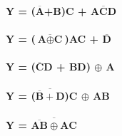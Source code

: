 \documentclass[a4paper, 100pt]{scrartcl}
\begin{document}
	
	\textbf{Y = ($\overline{\textbf{A}}$+B)C + $\overline{\textbf{ACD}}$} 
	\\
	\\
	\textbf{Y = ($\overline{\textbf{A} \oplus\textbf{C}}$)\textbf{AC} + $\overline{\textbf{D}}$} 
	\\
	\\
	\textbf{Y = ($\overline{\textbf{C}}$D + \textbf{BD}) $\oplus$ A}
	\\
	\\
	\textbf{Y = ($\overline{\overline{\textbf{B}}+\textbf{D}}$)C $\oplus$ AB}
	\\
	\\
	\textbf{Y = $\overline{\overline{\textbf{AB}}\oplus \textbf{AC}}$}
\end{document}
